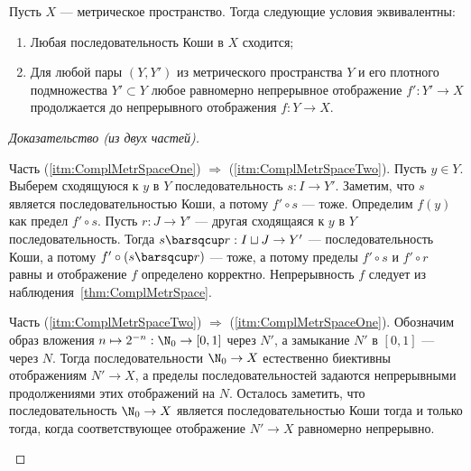 \documentclass[
	extrafontsizes,
	11pt,
	hyphens,
]{memoir}
\begin{document}
\begin{theorem}
Пусть \(X\) --- метрическое пространство.%
\label{thm:ComplMetrSpace}
Тогда следующие условия эквивалентны:
\begin{enumerate}[
	font=\upshape,
	label=\asbuk*),
	ref=\asbuk*,
	]
	
\item \label{itm:ComplMetrSpaceOne} Любая последовательность Коши в \(X\) сходится;

\item \label{itm:ComplMetrSpaceTwo} Для любой пары \((Y,Y')\) из метрического пространства \(Y\) и его плотного подмножества \(Y' \subset Y\) любое равномерно непрерывное отображение \(f' : Y' \to X\) продолжается до непрерывного отображения \(f : Y \to X\).

\end{enumerate}
\end{theorem}

\begin{proof}[Доказательство (из двух частей)]
~\begin{proofdescription}

\item[Часть (\ref{itm:ComplMetrSpaceOne}) \(\Rightarrow\) (\ref{itm:ComplMetrSpaceTwo}).]
Пусть \(y \in Y\). Выберем сходящуюся к \(y\) в \(Y\) последовательность \(s : I \to Y'\).
Заметим, что \(s\) является последовательностью Коши, а потому \(f' \circ s\) --- тоже.
Определим \(f(y)\) как предел \(f' \circ s\).
Пусть \(r : J \to Y'\) --- другая сходящаяся к \(y\) в \(Y\) последовательность.
Тогда \(s \barsqcup r : I \sqcup J \to Y'\) --- последовательность Коши, а потому \(f' \circ (s \barsqcup r)\) --- тоже, а потому пределы \(f' \circ s\) и \(f' \circ r\) равны и отображение \(f\) определено корректно.
Непрерывность \(f\) следует из наблюдения~\ref{thm:ComplMetrSpace}.

\item[Часть (\ref{itm:ComplMetrSpaceTwo}) \(\Rightarrow\) (\ref{itm:ComplMetrSpaceOne}).]
Обозначим образ вложения \(n \mapsto 2^{-n} : \N_0 \to [0,1]\) через \(N'\), а замыкание \(N'\) в \([0,1]\) --- через \(N\).
Тогда последовательности \(\N_0 \to X\) естественно биективны отображениям \(N' \to X\), а пределы последовательностей задаются непрерывными продолжениями этих отображений на \(N\).
Осталось заметить, что последовательность \(\N_0 \to X\) является последовательностью Коши тогда и только тогда, когда соответствующее отображение \(N' \to X\) равномерно непрерывно.
\qedhere

\end{proofdescription}
\end{proof}
\end{document}
